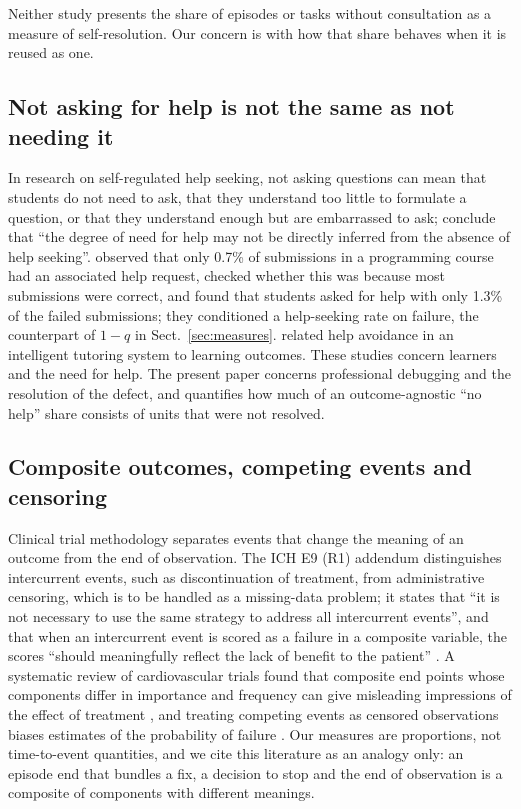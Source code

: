 \documentclass[pdflatex,sn-basic]{sn-jnl}
\begin{document}
Neither study presents the share of episodes or tasks without consultation as a measure of self-resolution. Our concern is with how that share behaves when it is reused as one.

\subsection{Not asking for help is not the same as not needing it}

In research on self-regulated help seeking, not asking questions can mean that students do not need to ask, that they understand too little to formulate a question, or that they understand enough but are embarrassed to ask; \citet{karabenick2011} conclude that ``the degree of need for help may not be directly inferred from the absence of help seeking''. \citet{hellas2023} observed that only 0.7\% of submissions in a programming course had an associated help request, checked whether this was because most submissions were correct, and found that students asked for help with only 1.3\% of the failed submissions; they conditioned a help-seeking rate on failure, the counterpart of $1-q$ in Sect.~\ref{sec:measures}. \citet{almeda2017} related help avoidance in an intelligent tutoring system to learning outcomes. These studies concern learners and the need for help. The present paper concerns professional debugging and the resolution of the defect, and quantifies how much of an outcome-agnostic ``no help'' share consists of units that were not resolved.

\subsection{Composite outcomes, competing events and censoring}

Clinical trial methodology separates events that change the meaning of an outcome from the end of observation. The ICH E9 (R1) addendum distinguishes intercurrent events, such as discontinuation of treatment, from administrative censoring, which is to be handled as a missing-data problem; it states that ``it is not necessary to use the same strategy to address all intercurrent events'', and that when an intercurrent event is scored as a failure in a composite variable, the scores ``should meaningfully reflect the lack of benefit to the patient'' \citep{ich2020e9r1}. A systematic review of cardiovascular trials found that composite end points whose components differ in importance and frequency can give misleading impressions of the effect of treatment \citep{ferreiragonzalez2007}, and treating competing events as censored observations biases estimates of the probability of failure \citep{gooley1999,austin2016}. Our measures are proportions, not time-to-event quantities, and we cite this literature as an analogy only: an episode end that bundles a fix, a decision to stop and the end of observation is a composite of components with different meanings.
\end{document}
